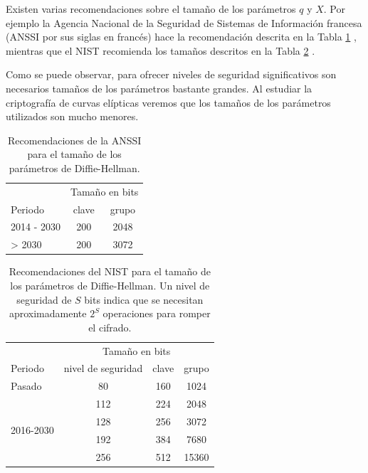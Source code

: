 \documentclass[
  a4paper,
  12pt,
  spanish,
]{scrartcl}
\begin{document}
Existen varias recomendaciones sobre el tamaño de los parámetros \(q\) y \(X\). Por ejemplo la Agencia Nacional de la Seguridad de Sistemas de Información francesa (ANSSI por sus siglas en francés) hace la recomendación descrita en la Tabla \ref{tab:tam-anssi} \parencite{anssi_mecanismes_2014}, mientras que el NIST recomienda los tamaños descritos en la Tabla \ref{tab:tam-nist} \parencite{barker_recommendation_2016}.

Como se puede observar, para ofrecer niveles de seguridad significativos son necesarios tamaños de los parámetros bastante grandes. Al estudiar la criptografía de curvas elípticas veremos que los tamaños de los parámetros utilizados son mucho menores. 

\begin{table}[h]
  \centering
  \sffamily
  \begin{tabular}{lcc}
    \toprule
    & \multicolumn{2}{c}{Tamaño en bits} \\
    Periodo & clave & grupo \\
    \midrule
    2014 - 2030 & 200 & 2048\\
    > 2030 & 200 & 3072\\
    \bottomrule
  \end{tabular}
  \caption{Recomendaciones de la ANSSI para el tamaño de los parámetros de Diffie-Hellman.}
  \label{tab:tam-anssi}
\end{table}

\begin{table}[h]
  \centering
  \sffamily
  \begin{tabular}{lccc}
    \toprule
     & \multicolumn{3}{c}{Tamaño en bits} \\
    Periodo & nivel de seguridad & clave & grupo \\
    \midrule
    Pasado & 80 & 160 & 1024\\
    \multirow[t]{4}{*}{2016-2030} & 112 & 224 & 2048\\
     & 128 & 256 & 3072\\
     & 192 & 384 & 7680\\
     & 256 & 512 & 15360\\
    \bottomrule
  \end{tabular}
  \caption{Recomendaciones del NIST para el tamaño de los parámetros de Diffie-Hellman. Un nivel de seguridad de \(S\) bits indica que se necesitan aproximadamente \(2^S\) operaciones para romper el cifrado.}
  \label{tab:tam-nist}
\end{table}
\end{document}
